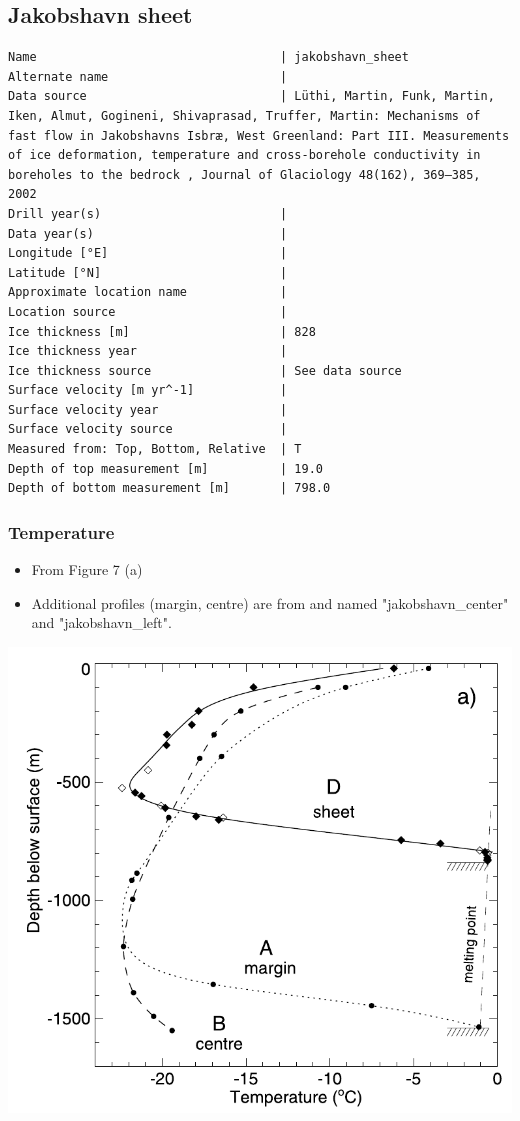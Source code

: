 \documentclass[article,a4paper,times,11pt,twoside]{article}
\begin{document}
\subsection{Jakobshavn sheet}
\label{sec:org119c10b}
\begin{verbatim}
Name                                  | jakobshavn_sheet
Alternate name                        | 
Data source                           | Lüthi, Martin, Funk, Martin, Iken, Almut, Gogineni, Shivaprasad, Truffer, Martin: Mechanisms of fast flow in Jakobshavns Isbræ, West Greenland: Part III. Measurements of ice deformation, temperature and cross-borehole conductivity in boreholes to the bedrock , Journal of Glaciology 48(162), 369–385, 2002 
Drill year(s)                         | 
Data year(s)                          | 
Longitude [°E]                        | 
Latitude [°N]                         | 
Approximate location name             | 
Location source                       | 
Ice thickness [m]                     | 828
Ice thickness year                    | 
Ice thickness source                  | See data source
Surface velocity [m yr^-1]            | 
Surface velocity year                 | 
Surface velocity source               | 
Measured from: Top, Bottom, Relative  | T
Depth of top measurement [m]          | 19.0
Depth of bottom measurement [m]       | 798.0
\end{verbatim}

\subsubsection{Temperature}
\label{sec:org2a64729}

\begin{itemize}
\item From \textcite{luthi_2002} Figure 7 (a)
\item Additional profiles (margin, centre) are from \textcite{iken_1993} and named "jakobshavn\_center" and "jakobshavn\_left".
\end{itemize}
\begin{center}
\includegraphics[width=.9\linewidth]{jakobshavn_sheet/luthi_2002_fig7.png}
\end{center}
\end{document}

